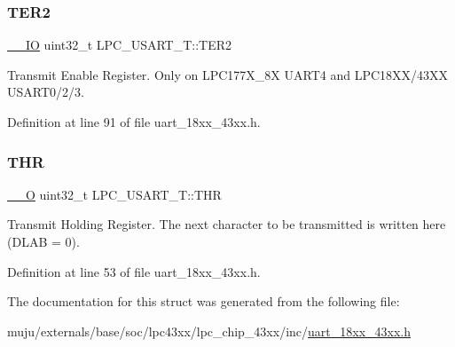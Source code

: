 \mbox{\label{struct_l_p_c___u_s_a_r_t___t_afc422e0333356dc62b23d404bfdbd1de}} 
\subsubsection{\texorpdfstring{T\+E\+R2}{TER2}}
{\footnotesize\ttfamily \hyperlink{core__sc300_8h_aec43007d9998a0a0e01faede4133d6be}{\+\_\+\+\_\+\+IO} uint32\+\_\+t L\+P\+C\+\_\+\+U\+S\+A\+R\+T\+\_\+\+T\+::\+T\+E\+R2}

Transmit Enable Register. Only on L\+P\+C177\+X\+\_\+8X U\+A\+R\+T4 and L\+P\+C18\+X\+X/43\+XX U\+S\+A\+R\+T0/2/3. 

Definition at line 91 of file uart\+\_\+18xx\+\_\+43xx.\+h.

\mbox{\label{struct_l_p_c___u_s_a_r_t___t_ae93392fb8e6c40f5b340ec0cf145ee1b}} 
\subsubsection{\texorpdfstring{T\+HR}{THR}}
{\footnotesize\ttfamily \hyperlink{core__sc300_8h_a7e25d9380f9ef903923964322e71f2f6}{\+\_\+\+\_\+O} uint32\+\_\+t L\+P\+C\+\_\+\+U\+S\+A\+R\+T\+\_\+\+T\+::\+T\+HR}

Transmit Holding Register. The next character to be transmitted is written here (D\+L\+AB = 0). 

Definition at line 53 of file uart\+\_\+18xx\+\_\+43xx.\+h.



The documentation for this struct was generated from the following file\+:\begin{DoxyCompactItemize}
\item 
muju/externals/base/soc/lpc43xx/lpc\+\_\+chip\+\_\+43xx/inc/\hyperlink{uart__18xx__43xx_8h}{uart\+\_\+18xx\+\_\+43xx.\+h}\end{DoxyCompactItemize}
